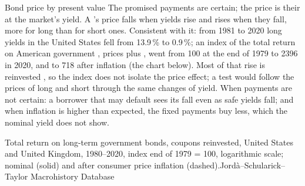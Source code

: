 \begin{model}{Bond price by present value}
\assumes The promised payments are certain; the price is their  at the market's yield.
\predicts A 's price falls when yields rise and rises when they fall, more for long  than for short ones.
\tested Consistent with it: from 1981 to 2020 long yields in the United States fell from 13.9\,\% to 0.9\,\%; an index of the total return on American
  government , prices plus , went from 100 at the end of 1979 to 2396 in 2020, and to 718 after inflation (the chart below). Most of
  that rise is reinvested , so the index does not isolate the price effect; a test would follow the prices of long and short 
  through the same changes of yield.
\breaks When payments are not certain: a borrower that may default sees its  fall even as safe yields fall; and when inflation is higher than expected, the fixed
  payments buy less, which the nominal yield does not show.
\end{model}

\begin{omchart}{Total return on long-term government bonds, coupons reinvested, United States and United Kingdom, 1980--2020, index end of 1979 = 100, logarithmic scale;
nominal (solid) and after consumer price inflation (dashed).}{Jordà--Schularick--Taylor Macrohistory Database}
\end{omchart}

